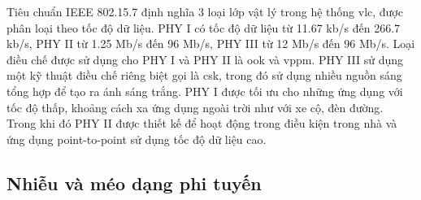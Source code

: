 Tiêu chuẩn IEEE 802.15.7 định nghĩa 3 loại lớp vật lý trong hệ thống \ac{vlc}, được phân loại theo tốc độ dữ liệu. PHY I có tốc độ dữ liệu từ 11.67 kb/s đến 266.7 kb/s, PHY II từ 1.25 Mb/s đến 96 Mb/s, PHY III từ 12 Mb/s đến 96 Mb/s. Loại điều chế được sử dụng cho PHY I và PHY II là \ac{ook} và \ac{vppm}. PHY III sử dụng một kỹ thuật điều chế riêng biệt gọi là \ac{csk}, trong đó sử dụng nhiều nguồn sáng tổng hợp để tạo ra ánh sáng trắng. PHY I được tối ưu cho những ứng dụng với tốc độ thấp, khoảng cách xa ứng dụng ngoài trời như với xe cộ, đèn đường. Trong khi đó PHY II được thiết kế để hoạt động trong điều kiện trong nhà và ứng dụng point-to-point sử dụng tốc độ dữ liệu cao. 

\subsection{Nhiễu và méo dạng phi tuyến}
